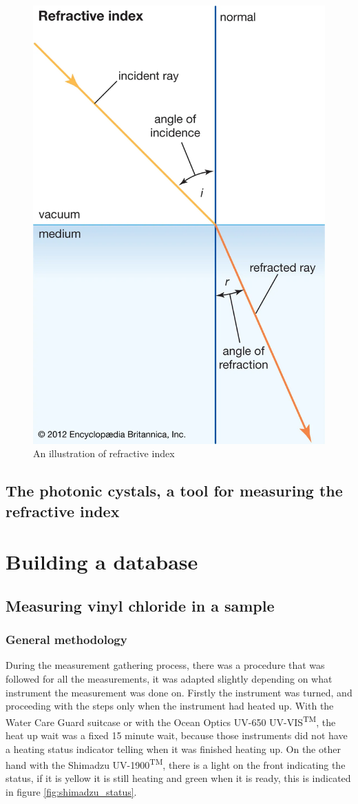 \documentclass{article}
\begin{document}
\begin{figure}[H]
    \centering
    \includegraphics[width=0.5\linewidth]{refractive_index.png}
    \caption{An illustration of refractive index\cite{ri_britannica}}
    \label{fig:ri}
\end{figure}


\subsection{The photonic cystals, a tool for measuring the refractive index}

\newpage
\section{Building a database}
\subsection{Measuring vinyl chloride in a sample}
\subsubsection{General methodology}
During the measurement gathering process, there was a procedure that was followed for all the measurements, it was adapted slightly depending on what instrument the measurement was done on.
Firstly the instrument was turned, and proceeding with the steps only when the instrument had heated up.
With the Water Care Guard suitcase or with the Ocean Optics UV-650 UV-VIS\textsuperscript{TM}, the heat up wait was a fixed 15 minute wait, because those instruments did not have a heating status indicator telling when it was finished heating up.
On the other hand with the Shimadzu UV-1900\textsuperscript{TM}, there is a light on the front indicating the status, if it is yellow it is still heating and green when it is ready, this is indicated in figure \ref{fig:shimadzu_status}.
\end{document}
